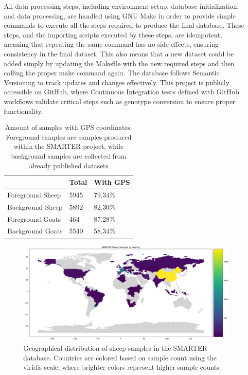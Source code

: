 \documentclass[a4paper,num-refs,gigabyte]{oup-contemporary}
\begin{document}
All data processing steps, including environment setup, database initialization, and data processing, are handled using GNU Make\citep{Stallman2004} in order to provide simple commands to execute all the steps required to produce the final database. These steps, and the importing scripts executed by these steps, are idempotent, meaning that repeating the same command has no side effects, ensuring consistency in the final dataset. This also means that a new dataset could be added simply by updating the Makefile with the new required steps and then calling the proper make command again. The database follows Semantic Versioning\citep{prestonwerner2013semantic} to track updates and changes effectively. This project is publicly accessible on GitHub\citep{SMARTERDB-GH}, where Continuous Integration tests defined with GitHub workflows validate critical steps such as genotype conversion to ensure proper functionality.

\begin{table}
\caption{Amount of samples with GPS coordinates. Foreground samples are samples produced within the SMARTER project, while background samples are collected from already published datasets}
\label{tab:samples}
\begin{center}
\begin{tabular}{l l l}
\toprule
& Total & With GPS \\
\midrule
Foreground Sheep & 5945 & 79,34\% \\
Background Sheep & 5892 & 82,30\% \\
Foreground Goats & 464 & 87,28\% \\
Background Goats & 5540 & 58,34\% \\
\bottomrule
\end{tabular}
\end{center}
\end{table}

\begin{figure}
\centering
\includegraphics[width=.95\textwidth]{sheep-by-country.png}
\caption{Geographical distribution of sheep samples in the SMARTER database. Countries are colored based on sample count using the viridis scale, where brighter colors represent higher sample counts.}
\label{fig:sheep_samples}
\end{figure}
\end{document}
